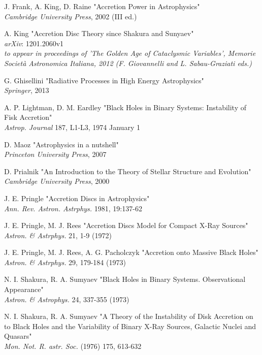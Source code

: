 \documentclass[a4paper]{article}
\begin{document}
\begin{thebibliography}{9}
	J. Frank, A. King, D. Raine
	"Accretion Power in Astrophysics"\\
	\textit{Cambridge University Press}, 2002 (III ed.)

	A. King 
	"Accretion Disc Theory since Shakura and Sunyaev"\\
	\textit{arXiv}: 1201.2060v1\\
	\textit{to appear in proceedings of 'The Golden Age of Cataclysmic Variables', Memorie Società Astronomica Italiana, 2012 (F. Giovannelli and L. Sabau-Graziati eds.)}
			
	G. Ghisellini
	"Radiative Processes in High Energy Astrophysics"\\
	\textit{Springer}, 2013

	A. P. Lightman, D. M. Eardley 
	"Black Holes in Binary Systems: Instability of Fisk Accretion"\\
	\textit{Astrop. Journal} 187, L1-L3, 1974 January 1
		
	D. Maoz
	"Astrophysics in a nutshell"\\
	\textit{Princeton University Press}, 2007
		
	D. Prialnik
	"An Introduction to the Theory of Stellar Structure and Evolution"\\
	\textit{Cambridge University Press}, 2000
		
	J. E. Pringle 
	"Accretion Discs in Astrophysics"\\
	\textit{Ann. Rev. Astron. Astrphys.} 1981, 19:137-62
	
	J. E. Pringle, M. J. Rees
	"Accretion Discs Model for Compact X-Ray Sources"\\
	\textit{Astron. \& Astrphys.} 21, 1-9 (1972)
	
	J. E. Pringle, M. J. Rees, A. G. Pacholczyk
	"Accretion onto Massive Black Holes"\\
	\textit{Astron. \& Astrphys.} 29, 179-184 (1973)
		
	N. I. Shakura, R. A. Sumyaev 
	"Black Holes in Binary Systems. Observational Appearance"\\
	\textit{Astron. \& Astrophys.} 24, 337-355 (1973)

	N. I. Shakura, R. A. Sumyaev 
	"A Theory of the Instability of Disk Accretion on to Black Holes and the Variability of Binary X-Ray Sources, Galactic Nuclei and Quasars"\\
	\textit{Mon. Not. R. astr. Soc.} (1976) 175, 613-632
	

\end{thebibliography}
\end{document}
